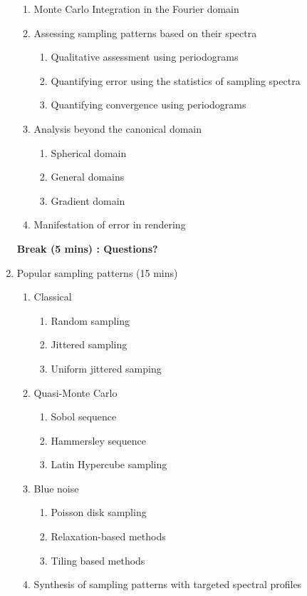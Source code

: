 \begin{enumerate}
\begin{enumerate}
		\item Monte Carlo Integration in the Fourier domain
		\item Assessing sampling patterns based on their spectra
		\begin{enumerate}
		\itemsep-0.6em
			\item Qualitative assessment using periodograms
			\item Quantifying error using the statistics of sampling spectra
			\item Quantifying convergence using periodograms
		\end{enumerate}
		\item Analysis beyond the canonical domain
		\begin{enumerate} 
		\itemsep-0.6em
			\item Spherical domain
			\item General domains
			\item Gradient domain
		\end{enumerate}
		\item Manifestation of error in rendering
	\end{enumerate}
	\textbf{Break (5 mins) : Questions?} 
	\item Popular sampling patterns (15 mins)
	\begin{enumerate}
	\itemsep-0.4em
		\item Classical
		\begin{enumerate}
		\itemsep-0.6em
			\item Random sampling
			\item Jittered sampling
			\item Uniform jittered samping
		\end{enumerate}
		\item Quasi-Monte Carlo
		\begin{enumerate}
		\itemsep-0.6em
			\item Sobol sequence
			\item Hammersley sequence
			\item Latin Hypercube sampling
		\end{enumerate}
		\item Blue noise
		\begin{enumerate}
		\itemsep-0.6em
			\item Poisson disk sampling
			\item Relaxation-based methods
			\item Tiling based methods
		\end{enumerate}
		\item Synthesis of sampling patterns with targeted spectral profiles

\end{enumerate}
\end{enumerate}
